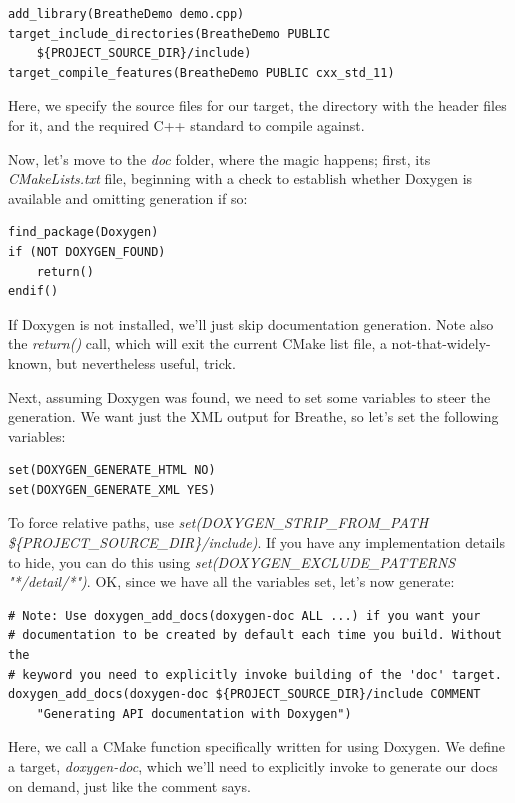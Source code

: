 \begin{lstlisting}[style=styleCMake]
add_library(BreatheDemo demo.cpp)
target_include_directories(BreatheDemo PUBLIC
	${PROJECT_SOURCE_DIR}/include)
target_compile_features(BreatheDemo PUBLIC cxx_std_11)
\end{lstlisting}

Here, we specify the source files for our target, the directory with the header files for it, and the required C++ standard to compile against.

Now, let's move to the \textit{doc} folder, where the magic happens; first, its \textit{CMakeLists.txt} file, beginning with a check to establish whether Doxygen is available and omitting generation if so:

\begin{lstlisting}[style=styleCMake]
find_package(Doxygen)
if (NOT DOXYGEN_FOUND)
	return()
endif()
\end{lstlisting}

If Doxygen is not installed, we'll just skip documentation generation. Note also the \textit{return()} call, which will exit the current CMake list file, a not-that-widely-known, but nevertheless useful, trick.

Next, assuming Doxygen was found, we need to set some variables to steer the generation. We want just the XML output for Breathe, so let's set the following variables:

\begin{lstlisting}[style=styleCMake]
set(DOXYGEN_GENERATE_HTML NO)
set(DOXYGEN_GENERATE_XML YES)
\end{lstlisting}

To force relative paths, use \textit{set(DOXYGEN\_STRIP\_FROM\_PATH \$\{PROJECT\_SOURCE\_DIR\}/include)}. If you have any implementation details to hide, you can do this using \textit{set(DOXYGEN\_EXCLUDE\_PATTERNS "*/detail/*")}. OK, since we have all the variables set, let's now generate:

\begin{lstlisting}[style=styleCMake]
# Note: Use doxygen_add_docs(doxygen-doc ALL ...) if you want your
# documentation to be created by default each time you build. Without the 
# keyword you need to explicitly invoke building of the 'doc' target.
doxygen_add_docs(doxygen-doc ${PROJECT_SOURCE_DIR}/include COMMENT
	"Generating API documentation with Doxygen")
\end{lstlisting}

Here, we call a CMake function specifically written for using Doxygen. We define a target, \textit{doxygen-doc}, which we'll need to explicitly invoke to generate our docs on demand, just like the comment says.

